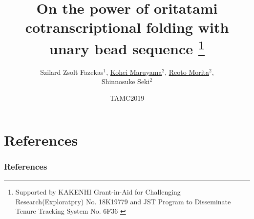 \documentclass[11pt]{beamer}
\title{On the power of oritatami cotranscriptional folding with unary bead sequence
\footnote{
{ \tiny
	Supported by KAKENHI Grant-in-Aid for Challenging Research(Exploratpry) No. 18K19779
and JST Program to Disseminate Tenure Tracking System No. 6F36
}
}}
\date{TAMC2019}
\author{Szilard Zsolt Fazekas${}^1$, \underline{Kohei Maruyama${}^2$}, \underline{Reoto Morita${}^2$}, \\Shinnosuke Seki${}^2$}
\institute{${}^1$Akita University, ${}^2$University of Electro-Communications}
\begin{document}
\begin{frame}\frametitle{}
 \titlepage
\end{frame}









\section{References}
\begin{frame}[t, allowframebreaks]\frametitle{References}

\end{frame}
\end{document}
